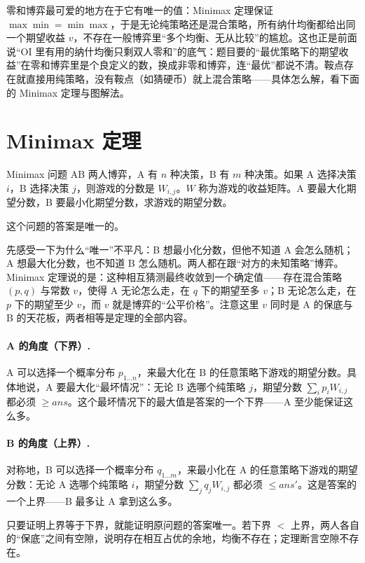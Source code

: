 零和博弈最可爱的地方在于它有唯一的值：Minimax 定理保证 $\max\min=\min\max$，于是无论纯策略还是混合策略，所有纳什均衡都给出同一个期望收益 $v$，不存在一般博弈里“多个均衡、无从比较”的尴尬。这也正是前面说“OI 里有用的纳什均衡只剩双人零和”的底气：题目要的“最优策略下的期望收益”在零和博弈里是个良定义的数，换成非零和博弈，连“最优”都说不清。鞍点存在就直接用纯策略，没有鞍点（如猜硬币）就上混合策略——具体怎么解，看下面的 Minimax 定理与图解法。

\section{Minimax 定理}
\begin{problem}{Minimax 问题}
AB 两人博弈，A 有 $n$ 种决策，B 有 $m$ 种决策。如果 A 选择决策 $i$，B 选择决策 $j$，则游戏的分数是 $W_{i,j}$。$W$ 称为游戏的收益矩阵。A 要最大化期望分数，B 要最小化期望分数，求游戏的期望分数。
\end{problem}

\begin{theorem}[Minimax 定理]\label{thm:minimax}
这个问题的答案是唯一的。
\end{theorem}

先感受一下为什么“唯一”不平凡：B 想最小化分数，但他不知道 A 会怎么随机；A 想最大化分数，也不知道 B 怎么随机。两人都在跟“对方的未知策略”博弈。Minimax 定理说的是：这种相互猜测最终收敛到一个确定值——存在混合策略 $(p,q)$ 与常数 $v$，使得 A 无论怎么走，在 $q$ 下的期望至多 $v$；B 无论怎么走，在 $p$ 下的期望至少 $v$，而 $v$ 就是博弈的“公平价格”。注意这里 $v$ 同时是 A 的保底与 B 的天花板，两者相等是定理的全部内容。

\paragraph{A 的角度（下界）.} A 可以选择一个概率分布 $p_{1\ldots n}$，来最大化在 B 的任意策略下游戏的期望分数。具体地说，A 要最大化“最坏情况”：无论 B 选哪个纯策略 $j$，期望分数 $\sum_i p_iW_{i,j}$ 都必须 $\ge ans$。这个最坏情况下的最大值是答案的一个下界——A 至少能保证这么多。

\paragraph{B 的角度（上界）.} 对称地，B 可以选择一个概率分布 $q_{1\ldots m}$，来最小化在 A 的任意策略下游戏的期望分数：无论 A 选哪个纯策略 $i$，期望分数 $\sum_j q_jW_{i,j}$ 都必须 $\le ans'$。这是答案的一个上界——B 最多让 A 拿到这么多。

只要证明上界等于下界，就能证明原问题的答案唯一。若下界 $<$ 上界，两人各自的“保底”之间有空隙，说明存在相互占优的余地，均衡不存在；定理断言空隙不存在。

